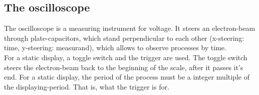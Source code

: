 \subsection{The oscilloscope}
The oscilloscope is a measuring instrument for voltage. It steers an electron-beam through plate-capacitors, which stand perpendicular to each other (x-steering: time, y-steering: measurand), which allows to observe processes by time.\\
For a static display, a toggle switch and the trigger are used. The toggle switch steers the electron-beam back to the beginning of the scale, after it passes it's end. For a static display, the period of the process must be a integer multiple of the displaying-period. That is, what the trigger is for.
